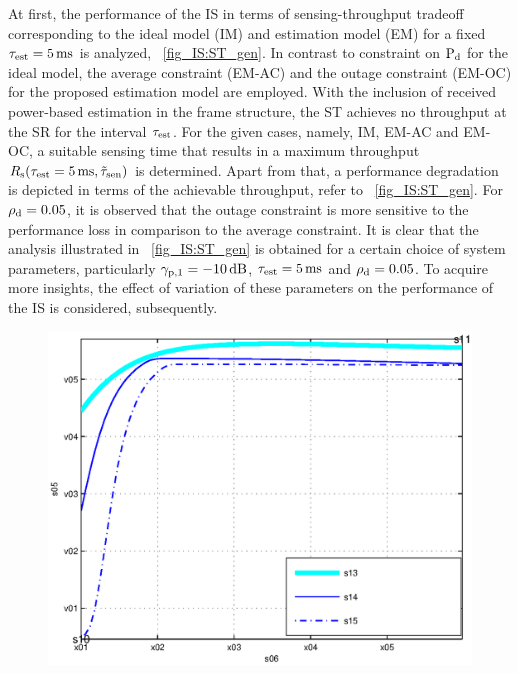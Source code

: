 {At first, the performance of the IS in terms of sensing-throughput tradeoff corresponding to the ideal model (IM) and estimation model (EM) for a fixed $\tau_{\text{est}} = \SI{5}{ms}$ is analyzed,  \figurename~\ref{fig_IS:ST_gen}. In contrast to constraint on $\text{P}_{\text{d}}$ for the ideal model, the average constraint (EM-AC) and the outage constraint (EM-OC) for the proposed estimation model are employed. With the inclusion of received power-based estimation in the frame structure, the ST achieves no throughput at the SR for the interval $\tau_{\text{est}}$. For the given cases, namely, IM, EM-AC and EM-OC, a suitable sensing time that results in a maximum throughput $R_{\text{s}}(\tau_{\text{est}} = \SI{5}{ms},\tilde{\tau}_{\text{sen}})$ is determined. Apart from that, a performance degradation is depicted in terms of the achievable throughput, refer to \figurename~\ref{fig_IS:ST_gen}. For $\rho_{\text{d}} = 0.05$, it is observed that the outage constraint is more sensitive to the performance loss in comparison to the average constraint. It is clear that the analysis illustrated in \figurename~\ref{fig_IS:ST_gen} is obtained for a certain choice of system parameters, particularly ${\gamma}_{\text{p,1}} = -\SI{10}{dB}$, $\tau_{\text{est}} = \SI{5}{ms}$ and $\rho_{\text{d}} = 0.05$. To acquire more insights, the effect of variation of these parameters on the performance of the IS is considered, subsequently. 

\begin{figure}[!ht]


\centering
\includegraphics[width= \figscale]{figures/fig_opt_thr_vs_SNR_AWGN}
\caption{}
\label{fig_IS:optT_snr}
\vspace{-0.7cm}
\end{figure}

}
